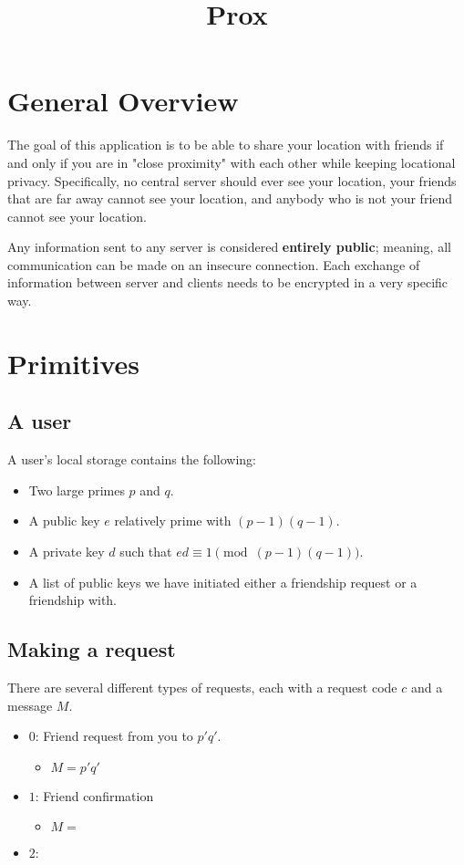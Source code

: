 \documentclass{article}
\begin{document}
\title{Prox}
\maketitle

\section{General Overview}
The goal of this application is to be able to share your location with friends if and only if you are in "close proximity" with each other while keeping locational privacy. Specifically, no central server should ever see your location, your friends that are far away cannot see your location, and anybody who is not your friend cannot see your location.

Any information sent to any server is considered \textbf{entirely public}; meaning, all communication can be made on an insecure connection. Each exchange of information between server and clients needs to be encrypted in a very specific way.

\section{Primitives}

\subsection{A user}
A user's local storage contains the following:

\begin{itemize}
    \item Two large primes $p$ and $q$.
    \item A public key $e$ relatively prime with $(p-1)(q-1)$.
    \item A private key $d$ such that $ed \equiv 1 \pmod{(p-1)(q-1)}$.
    \item A list of public keys we have initiated either a friendship request or a friendship with. 
\end{itemize}

\subsection{Making a request}

There are several different types of requests, each with a request code $c$ and a message $M$.

\begin{itemize}
    \item $0$: Friend request from you to $p'q'$.
    \begin{itemize}
        \item $M=p'q'$
    \end{itemize}
    \item $1$: Friend confirmation
    \begin{itemize}
        \item $M=$
    \end{itemize}
    \item $2$: 
\end{itemize}
\end{document}
